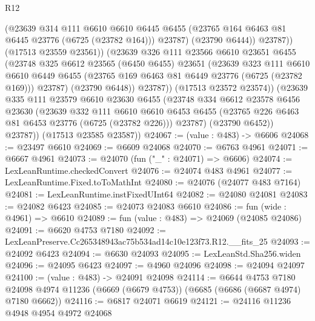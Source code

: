 \begin{lexlean}{R12}
\begin{coremodule}
                    (@23639
                      @314
                      @111
                      @6610
                      @6610
                      @6445
                      @6455
                      (@23765 @164 @6463 @81 @6445 @23776 (@6725 (@23782 @164)))
                      @23787)
                    (@23790 @6444))
                  @23787))
              (@17513 @23559 @23561))
            (@23639
              @326
              @111
              @23566
              @6610
              @23651
              @6455
              (@23748
                @325
                @6612
                @23565
                (@6450 @6455)
                @23651
                (@23639
                  @323
                  @111
                  @6610
                  @6610
                  @6449
                  @6455
                  (@23765 @169 @6463 @81 @6449 @23776 (@6725 (@23782 @169)))
                  @23787)
                (@23790 @6448))
              @23787))
          (@17513 @23572 @23574))
        (@23639
          @335
          @111
          @23579
          @6610
          @23630
          @6455
          (@23748
            @334
            @6612
            @23578
            @6456
            @23630
            (@23639
              @332
              @111
              @6610
              @6610
              @6453
              @6455
              (@23765 @226 @6463 @81 @6453 @23776 (@6725 (@23782 @226)))
              @23787)
            (@23790 @6452))
          @23787))
      (@17513 @23585 @23587))
@24067 := (value : @483) -> @6606
@24068 := @23497 @6610
@24069 := @6609 @24068
@24070 := @6763 @4961
@24071 := @6667 @4961
@24073 := @24070 (fun ("_" : @24071) => @6606)
@24074 := LexLeanRuntime.checkedConvert
@24076 := @24074 @483 @4961
@24077 := LexLeanRuntime.Fixed.toToMathInt
@24080 := @24076 (@24077 @483 @7164)
@24081 := LexLeanRuntime.instFixedUInt64
@24082 := @24080 @24081
@24083 := @24082 @6423
@24085 := @24073 @24083 @6610
@24086 := fun (wide : @4961) => @6610
@24089 := fun (value : @483) => @24069 (@24085 @24086)
@24091 := @6620 @4753 @7180
@24092 := LexLeanPreserve.Cc265348943ac75b534ad14c10e123f73.R12.__fits_25
@24093 := @24092 @6423
@24094 := @6630 @24093
@24095 := LexLeanStd.Sha256.widen
@24096 := @24095 @6423
@24097 := @4960 @24096
@24098 := @24094 @24097
@24100 := (value : @483) -> @24091 @24098
@24114 := @6644
    @4753
    @7180
    @24098
    @4974
    @11236
    (@6669 (@6679 @4753))
    (@6685 (@6686 (@6687 @4974) @7180 @6662))
@24116 := @6817 @24071 @6619
@24121 := @24116 @11236 @4948 @4954 @4972 @24068

\end{coremodule}
\end{lexlean}
